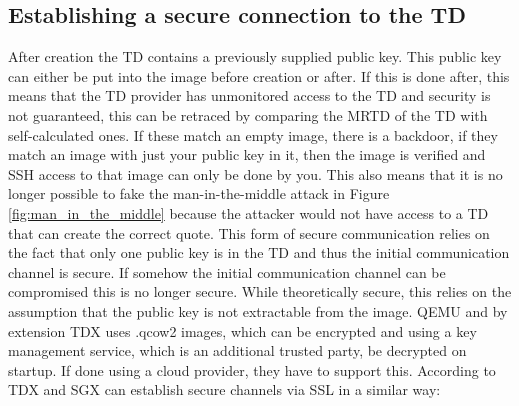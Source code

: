 \subsection{Establishing a secure connection to the TD}
\label{Establishing_a_secure_connection}
After creation the TD contains a previously supplied public key. This public key can either be put into the image before creation or after. If this is done after, this means that the TD provider has unmonitored access to the TD and security is not guaranteed, this can be retraced by comparing the MRTD of the TD with self-calculated ones. If these match an empty image, there is a backdoor, if they match an image with just your public key in it, then the image is verified and SSH access to that image can only be done by you. This also means that it is no longer possible to fake the man-in-the-middle attack in Figure \ref{fig:man_in_the_middle} because the attacker would not have access to a TD that can create the correct quote. This form of secure communication relies on the fact that only one public key is in the TD and thus the initial communication channel is secure. If somehow the initial communication channel can be compromised this is no longer secure. While theoretically secure, this relies on the assumption that the public key is not extractable from the image. QEMU and by extension TDX uses .qcow2 images, which can be encrypted and using a key management service, which is an additional trusted party, be decrypted on startup. If done using a cloud provider, they have to support this.
According to \cite{cheng_intel_2023} TDX and SGX can establish secure channels via SSL in a similar way:
